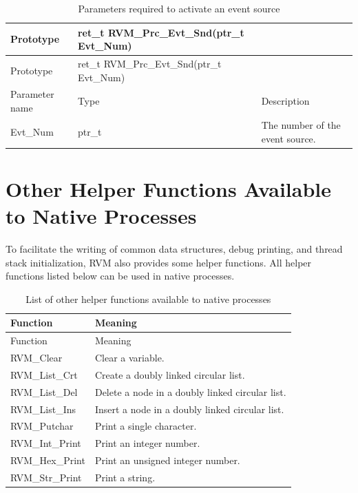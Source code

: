 \begin{xltabular}{\textwidth}{@{}>{\hsize\raggedright\arraybackslash}X>{\hsize\raggedright\arraybackslash}X>{\hsize\raggedright\arraybackslash}X@{}}
\caption{Parameters required to activate an event source}\label{tab:3-12}\\
\toprule
Prototype & ret\_\allowbreak{}t RVM\_\allowbreak{}Prc\_\allowbreak{}Evt\_\allowbreak{}Snd(ptr\_\allowbreak{}t Evt\_\allowbreak{}Num) &\tabularnewline
\endfirsthead
\toprule
Prototype & ret\_\allowbreak{}t RVM\_\allowbreak{}Prc\_\allowbreak{}Evt\_\allowbreak{}Snd(ptr\_\allowbreak{}t Evt\_\allowbreak{}Num) &\tabularnewline
\midrule
\endhead
\bottomrule
\endlastfoot
Parameter name & Type & Description\tabularnewline
Evt\_\allowbreak{}Num & ptr\_\allowbreak{}t & The number of the event source.\tabularnewline
\end{xltabular}

\section{Other Helper Functions Available to Native Processes}\label{sec:3-6}

To facilitate the writing of common data structures, debug printing, and thread stack initialization, RVM also provides some helper functions. All helper functions listed below can be used in native processes.

\begin{xltabular}{\textwidth}{@{}>{\hsize\raggedright\arraybackslash}X>{\hsize\raggedright\arraybackslash}X@{}}
\caption{List of other helper functions available to native processes}\label{tab:3-13}\\
\toprule
Function & Meaning\tabularnewline
\endfirsthead
\toprule
Function & Meaning\tabularnewline
\midrule
\endhead
\bottomrule
\endlastfoot
RVM\_\allowbreak{}Clear & Clear a variable.\tabularnewline
RVM\_\allowbreak{}List\_\allowbreak{}Crt & Create a doubly linked circular list.\tabularnewline
RVM\_\allowbreak{}List\_\allowbreak{}Del & Delete a node in a doubly linked circular list.\tabularnewline
RVM\_\allowbreak{}List\_\allowbreak{}Ins & Insert a node in a doubly linked circular list.\tabularnewline
RVM\_\allowbreak{}Putchar & Print a single character.\tabularnewline
RVM\_\allowbreak{}Int\_\allowbreak{}Print & Print an integer number.\tabularnewline
RVM\_\allowbreak{}Hex\_\allowbreak{}Print & Print an unsigned integer number.\tabularnewline
RVM\_\allowbreak{}Str\_\allowbreak{}Print & Print a string.\tabularnewline
\end{xltabular}


